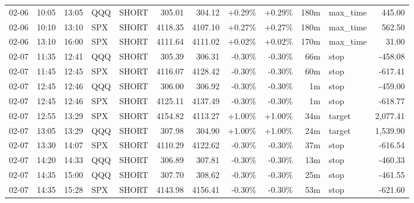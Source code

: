 \documentclass[11pt,a4paper,twoside]{article}
\begin{document}
\begin{center}
\begin{longtable}{>{\color{txtmain}}l l l l l r r r r r >{\color{txtmain}}l r}
02-06 & 10:05 & 13:05 & QQQ & SHORT & 305.01 & 304.12 & \textcolor{wingreen}{+0.29\%} & \textcolor{wingreen}{+0.29\%} & 180m & max\_time & \textcolor{wingreen}{445.00} \\
02-06 & 10:10 & 13:10 & SPX & SHORT & 4118.35 & 4107.10 & \textcolor{wingreen}{+0.27\%} & \textcolor{wingreen}{+0.27\%} & 180m & max\_time & \textcolor{wingreen}{562.50} \\
02-06 & 13:10 & 16:00 & SPX & SHORT & 4111.64 & 4111.02 & \textcolor{wingreen}{+0.02\%} & \textcolor{wingreen}{+0.02\%} & 170m & max\_time & \textcolor{wingreen}{31.00} \\
02-07 & 11:35 & 12:41 & QQQ & SHORT & 305.39 & 306.31 & \textcolor{lossred}{-0.30\%} & \textcolor{lossred}{-0.30\%} & 66m & stop & \textcolor{lossred}{-458.08} \\
02-07 & 11:45 & 12:45 & SPX & SHORT & 4116.07 & 4128.42 & \textcolor{lossred}{-0.30\%} & \textcolor{lossred}{-0.30\%} & 60m & stop & \textcolor{lossred}{-617.41} \\
02-07 & 12:45 & 12:46 & QQQ & SHORT & 306.00 & 306.92 & \textcolor{lossred}{-0.30\%} & \textcolor{lossred}{-0.30\%} & 1m & stop & \textcolor{lossred}{-459.00} \\
02-07 & 12:45 & 12:46 & SPX & SHORT & 4125.11 & 4137.49 & \textcolor{lossred}{-0.30\%} & \textcolor{lossred}{-0.30\%} & 1m & stop & \textcolor{lossred}{-618.77} \\
02-07 & 12:55 & 13:29 & SPX & SHORT & 4154.82 & 4113.27 & \textcolor{wingreen}{+1.00\%} & \textcolor{wingreen}{+1.00\%} & 34m & target & \textcolor{wingreen}{2,077.41} \\
02-07 & 13:05 & 13:29 & QQQ & SHORT & 307.98 & 304.90 & \textcolor{wingreen}{+1.00\%} & \textcolor{wingreen}{+1.00\%} & 24m & target & \textcolor{wingreen}{1,539.90} \\
02-07 & 13:30 & 14:07 & SPX & SHORT & 4110.29 & 4122.62 & \textcolor{lossred}{-0.30\%} & \textcolor{lossred}{-0.30\%} & 37m & stop & \textcolor{lossred}{-616.54} \\
02-07 & 14:20 & 14:33 & QQQ & SHORT & 306.89 & 307.81 & \textcolor{lossred}{-0.30\%} & \textcolor{lossred}{-0.30\%} & 13m & stop & \textcolor{lossred}{-460.33} \\
02-07 & 14:35 & 15:00 & QQQ & SHORT & 307.70 & 308.62 & \textcolor{lossred}{-0.30\%} & \textcolor{lossred}{-0.30\%} & 25m & stop & \textcolor{lossred}{-461.55} \\
02-07 & 14:35 & 15:28 & SPX & SHORT & 4143.98 & 4156.41 & \textcolor{lossred}{-0.30\%} & \textcolor{lossred}{-0.30\%} & 53m & stop & \textcolor{lossred}{-621.60} \\

\end{longtable}
\end{center}
\end{document}
